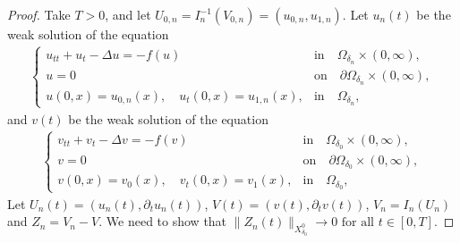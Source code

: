\documentclass[11pt]{amsart}
\begin{document}
\begin{proof}
    Take $T>0$, and let $U_{0,n} = I_n^{-1}(V_{0,n})=(u_{0,n},u_{1,n})$. Let  $u_n(t)$ be the weak solution of the equation
    \begin{align}\label{eq:3.1}
        \left\{\begin{array}{ll}
u_{tt} + u_t - \Delta u = -f(u) ~& \mbox{in}\quad \Omega_{\delta_n} \times (0,\infty), \\
u=0 &\mbox{on} \quad \partial \Omega_{\delta_n} \times (0, \infty), \\
u(0,x) = u_{0,n}(x), \quad u_t(0,x)=u_{1,n}(x),& \mbox{in}  \quad \Omega_{\delta_n},
\end{array}\right.\end{align}
and $v(t)$  be the weak solution of the equation
\begin{align}\label{eq:3.2}
    \left\{\begin{array}{ll}
v_{tt} + v_t - \Delta v = -f(v)~& \mbox{in}\quad \Omega_{\delta_0} \times (0,\infty), \\
v=0 &\mbox{on} \quad \partial \Omega_{\delta_0} \times (0, \infty), \\
v(0,x) = v_0(x), \quad v_t(0,x)=v_1(x),& \mbox{in}  \quad \Omega_{\delta_0},
\end{array}\right.\end{align}
Let $U_n(t) = (u_n(t), \partial_t u_n(t))$, $V(t) = (v(t), \partial_t v(t))$, $V_n = I_n(U_n)$ and $Z_n = V_n - V$. We need to show that $\|Z_n (t)\|_{X^0_{\delta_0}}\rightarrow 0 \mbox{ for all } t\in [0, T].$ 


\end{proof}
\end{document}
